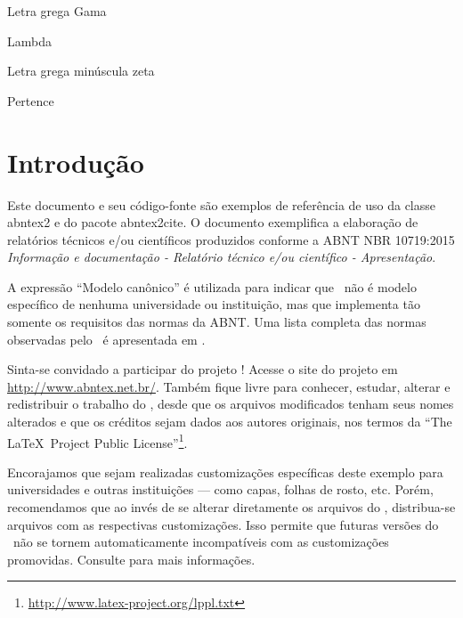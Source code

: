 \documentclass[
	12pt,				%
	openright,			%
	twoside,			%
	a4paper,			%
	english,			%
	french,				%
	spanish,			%
	brazil,				%
	]{abntex2}
\begin{document}
\begin{simbolos}
  \item[$ \Gamma $] Letra grega Gama
  \item[$ \Lambda $] Lambda
  \item[$ \zeta $] Letra grega minúscula zeta
  \item[$ \in $] Pertence
\end{simbolos}

\tableofcontents*
\cleardoublepage


\textual

\chapter*[Introdução]{Introdução}

Este documento e seu código-fonte são exemplos de referência de uso da classe
\textsf{abntex2} e do pacote \textsf{abntex2cite}. O documento 
exemplifica a elaboração de relatórios técnicos e/ou científicos produzidos
conforme a ABNT NBR 10719:2015 \emph{Informação e documentação - Relatório
técnico e/ou científico - Apresentação}.

A expressão ``Modelo canônico'' é utilizada para indicar que \abnTeX\ não é
modelo específico de nenhuma universidade ou instituição, mas que implementa tão
somente os requisitos das normas da ABNT. Uma lista completa das normas
observadas pelo \abnTeX\ é apresentada em .

Sinta-se convidado a participar do projeto \abnTeX! Acesse o site do projeto em
\url{http://www.abntex.net.br/}. Também fique livre para conhecer,
estudar, alterar e redistribuir o trabalho do \abnTeX, desde que os arquivos
modificados tenham seus nomes alterados e que os créditos sejam dados aos
autores originais, nos termos da ``The \LaTeX\ Project Public
License''\footnote{\url{http://www.latex-project.org/lppl.txt}}.

Encorajamos que sejam realizadas customizações específicas deste exemplo para
universidades e outras instituições --- como capas, folhas de rosto, etc.
Porém, recomendamos que ao invés de se alterar diretamente os arquivos do
\abnTeX, distribua-se arquivos com as respectivas customizações.
Isso permite que futuras versões do \abnTeX~não se tornem automaticamente
incompatíveis com as customizações promovidas. Consulte
 para mais informações.
\end{document}
